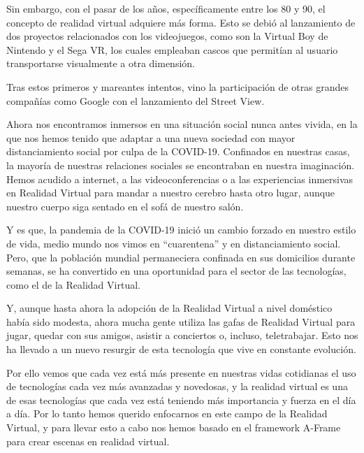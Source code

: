 \documentclass[a4paper, 12pt]{book}
\begin{document}
Sin embargo, con el pasar de los años, específicamente entre los 80 y 90, el concepto de realidad virtual adquiere más forma. Esto se debió al lanzamiento de dos proyectos relacionados con los videojuegos, como son la Virtual Boy de Nintendo y el Sega VR, los cuales empleaban cascos que permitían al usuario transportarse visualmente a otra dimensión.

Tras estos primeros y mareantes intentos, vino la participación de otras grandes compañías como Google con el lanzamiento del Street View.

Ahora nos encontramos inmersos en una situación social nunca antes vivida, en la que nos hemos tenido que adaptar a una nueva sociedad con mayor distanciamiento social por culpa de la COVID-19.
\newpage
Confinados en nuestras casas, la mayoría de nuestras relaciones sociales se encontraban en nuestra imaginación. Hemos acudido a internet, a las videoconferencias o a las experiencias inmersivas en Realidad Virtual para mandar a nuestro cerebro hasta otro lugar, aunque nuestro cuerpo siga sentado en el sofá de nuestro salón.

Y es que, la pandemia de la COVID-19 inició un cambio forzado en nuestro estilo de vida, medio mundo nos vimos en “cuarentena” y en distanciamiento social. Pero, que la población mundial permaneciera confinada en sus domicilios durante semanas, se ha convertido en una oportunidad para el sector de las tecnologías, como el de la Realidad Virtual.

Y, aunque hasta ahora la adopción de la Realidad Virtual a nivel doméstico había sido modesta, ahora mucha gente utiliza las gafas de Realidad Virtual para jugar, quedar con sus amigos, asistir a conciertos o, incluso, teletrabajar. Esto nos ha llevado a un nuevo resurgir de esta tecnología que vive en constante evolución.

Por ello vemos que cada vez está más presente en nuestras vidas cotidianas el uso de tecnologías cada vez más avanzadas y novedosas, y la realidad virtual es una de esas tecnologías que cada vez está teniendo más importancia y fuerza en el día a día.
Por lo tanto hemos querido enfocarnos en este campo de la Realidad Virtual, y para llevar esto a cabo nos hemos basado en el framework A-Frame para crear escenas en realidad virtual.


\end{document}
